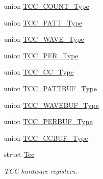 \begin{DoxyCompactItemize}
\item 
union \hyperlink{union_t_c_c___c_o_u_n_t___type}{T\+C\+C\+\_\+\+C\+O\+U\+N\+T\+\_\+\+Type}
\item 
union \hyperlink{union_t_c_c___p_a_t_t___type}{T\+C\+C\+\_\+\+P\+A\+T\+T\+\_\+\+Type}
\item 
union \hyperlink{union_t_c_c___w_a_v_e___type}{T\+C\+C\+\_\+\+W\+A\+V\+E\+\_\+\+Type}
\item 
union \hyperlink{union_t_c_c___p_e_r___type}{T\+C\+C\+\_\+\+P\+E\+R\+\_\+\+Type}
\item 
union \hyperlink{union_t_c_c___c_c___type}{T\+C\+C\+\_\+\+C\+C\+\_\+\+Type}
\item 
union \hyperlink{union_t_c_c___p_a_t_t_b_u_f___type}{T\+C\+C\+\_\+\+P\+A\+T\+T\+B\+U\+F\+\_\+\+Type}
\item 
union \hyperlink{union_t_c_c___w_a_v_e_b_u_f___type}{T\+C\+C\+\_\+\+W\+A\+V\+E\+B\+U\+F\+\_\+\+Type}
\item 
union \hyperlink{union_t_c_c___p_e_r_b_u_f___type}{T\+C\+C\+\_\+\+P\+E\+R\+B\+U\+F\+\_\+\+Type}
\item 
union \hyperlink{union_t_c_c___c_c_b_u_f___type}{T\+C\+C\+\_\+\+C\+C\+B\+U\+F\+\_\+\+Type}
\item 
struct \hyperlink{struct_tcc}{Tcc}
\begin{DoxyCompactList}\small\item\em T\+C\+C hardware registers. \end{DoxyCompactList}\end{DoxyCompactItemize}

